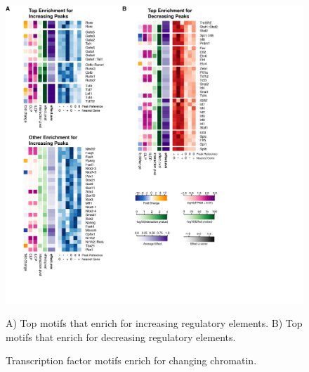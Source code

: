 \begin{figure}[p]
\begin{center}
	\includegraphics[width=\textwidth]{figures/chapter4/Figure_5_enrichment_results}
\end{center}
	\caption{Transcription factor motifs enrich for changing chromatin.} 
	A) Top motifs that enrich for increasing regulatory elements. B) Top motifs that enrich for decreasing regulatory elements. 
	\label{fig:chap4_enrich}
\end{figure}

